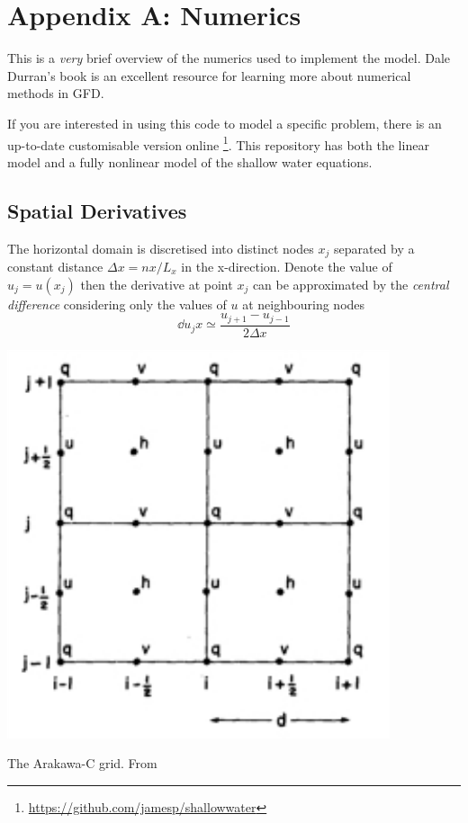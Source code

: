 \documentclass[a4paper, sfsidenotes, twoside]{tufte-handout}
\begin{document}
  \section{Appendix A: Numerics}
  \label{sec:appendixa}

  \noindent This is a \emph{very} brief overview of the numerics used to implement the model.
  Dale Durran's book \cite{Durran:2010hy} is an excellent resource for learning more about numerical methods in GFD.

  If you are interested in using this code to model a specific problem, there is an up-to-date customisable version online \footnote{\url{https://github.com/jamesp/shallowwater}}.
  This repository has both the linear model and a fully nonlinear model of the shallow water equations.

  \subsection{Spatial Derivatives}
  \label{sub:spatialderivatives}
  The horizontal domain is discretised into distinct nodes $x_j$ separated by a constant distance $\Delta x = nx / L_x$ in the x-direction.
  Denote the value of $u_j = u(x_j)$ then the derivative at point $x_j$ can be approximated by the \emph{central difference} considering only the values of $u$ at neighbouring nodes
  \begin{equation}
    \label{eq:cendiff}
    \dd{u_j}{x} \simeq \frac{u_{j+1} - u_{j-1}}{2 \Delta x}
  \end{equation}
  \begin{marginfigure}
    \includegraphics{cgrid}
    \caption{The Arakawa-C grid. From \citep{Arakawa:1981bx}}
    \label{fig:cgrid}
  \end{marginfigure}
\end{document}
